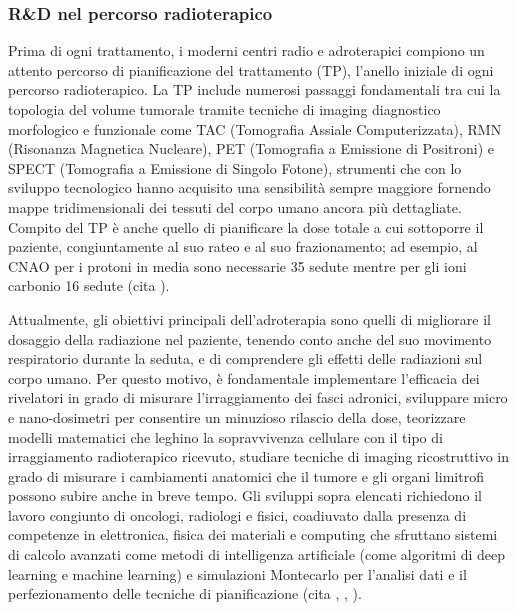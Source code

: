 \documentclass[12pt,a4paper,twoside]{report}
\begin{document}
	\subsubsection{R\&D nel percorso radioterapico}
	Prima di ogni trattamento, i moderni centri radio e adroterapici compiono un attento percorso di pianificazione del trattamento (TP), l'anello iniziale di ogni percorso radioterapico. La TP  include numerosi passaggi fondamentali tra cui la topologia del volume tumorale tramite tecniche di imaging diagnostico morfologico e funzionale come TAC (Tomografia Assiale Computerizzata), RMN (Risonanza Magnetica Nucleare), PET (Tomografia a Emissione di Positroni) e SPECT (Tomografia a Emissione di Singolo Fotone), strumenti che con lo sviluppo tecnologico hanno acquisito una sensibilità sempre maggiore fornendo mappe tridimensionali dei tessuti del corpo umano ancora più dettagliate. Compito del TP è anche quello di pianificare la dose totale a cui sottoporre il paziente, congiuntamente al suo rateo e al suo frazionamento; ad esempio, al CNAO per i protoni in media sono necessarie 35 sedute mentre per gli ioni carbonio 16 sedute (cita
	).
	
	Attualmente, gli obiettivi principali dell'adroterapia sono quelli di migliorare il dosaggio della radiazione nel paziente, tenendo conto anche del suo movimento respiratorio durante la seduta, e di comprendere gli effetti delle radiazioni sul corpo umano. Per questo motivo, è fondamentale implementare l'efficacia dei rivelatori in grado di misurare l'irraggiamento dei fasci adronici, sviluppare micro e nano-dosimetri per consentire un minuzioso rilascio della dose, teorizzare modelli matematici che leghino la sopravvivenza cellulare con il tipo di irraggiamento radioterapico ricevuto, studiare tecniche di imaging ricostruttivo in grado di misurare i cambiamenti anatomici che il tumore e gli organi limitrofi possono subire anche in breve tempo. Gli sviluppi sopra elencati richiedono il lavoro congiunto di oncologi, radiologi e fisici, coadiuvato dalla presenza di competenze in elettronica, fisica dei materiali e computing che sfruttano sistemi di calcolo avanzati come metodi di intelligenza artificiale (come algoritmi di deep learning e machine learning) e simulazioni Montecarlo per l'analisi dati e il perfezionamento delle tecniche di pianificazione (cita
	,
	,
	).
	
\end{document}
